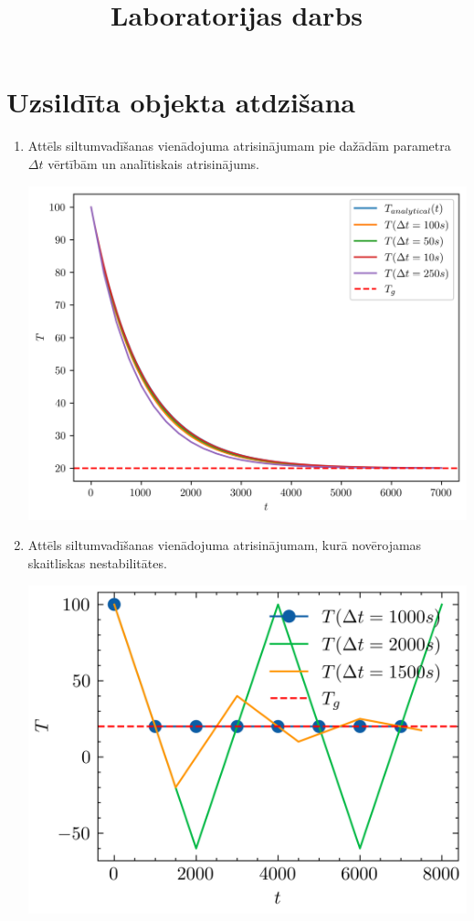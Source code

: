 \documentclass[12pt]{article}
\title{\vspace{-1cm}\centering Laboratorijas darbs \\[1ex] \large \say{Siltumvadīšana} \vspace{-6em}}
\author{}
\date{}
\begin{document}
\maketitle

\section*{Uzsildīta objekta atdzišana}

\begin{enumerate}
  \item Attēls siltumvadīšanas vienādojuma atrisinājumam pie dažādām
        parametra~$\Delta t$ vērtībām un analītiskais atrisinājums.
\begin{center}
\includegraphics[]{1.1.png}
\end{center}
        
  \item Attēls siltumvadīšanas vienādojuma atrisinājumam,
        kurā novērojamas skaitliskas nestabilitātes.

\begin{center}
    \includegraphics[]{1.2.png}
\end{center}
    

\end{enumerate}
\end{document}
